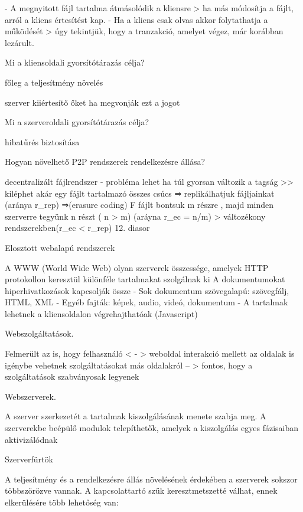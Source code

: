 \documentclass[12pt]{article}
\begin{document}
\begin{description}
        - A megnyitott fájl tartalma átmásolódik a kliensre
        > ha más módosítja a fájlt, arról a kliens értesítést kap.
        - Ha a kliens csak olvas akkor folytathatja a működését 
        > úgy tekintjük, hogy a tranzakció, amelyet végez, már korábban lezárult.	
    \item  Mi a kliensoldali gyorsítótárazás célja?
    \item főleg a teljesítmény növelés
    \item szerver kiiértesítő őket ha megvonják ezt a jogot
    \item  Mi a szerveroldali gyorsítótárazás célja?
    \item hibatűrés biztosítása
    \item  Hogyan növelhető P2P rendszerek rendelkezésre állása?
    \item decentralizált fájlrendszer
        - probléma lehet ha túl gyorsan változik a tagság >> kiléphet akár egy fájlt tartalmazó összes csúcs
        ⇒ replikálhatjuk fájljainkat (aránya r\_rep)
        ⇒(erasure coding) F fájlt bontsuk m részre , majd minden szerverre
        tegyünk n részt ( n > m) (aráyna r\_ec = n/m) 
        > változékony rendszerekben(r\_ec < r\_rep)
        12. diasor
    \item  Elosztott webalapú rendszerek
    \item A WWW (World Wide Web) olyan szerverek összessége, amelyek HTTP protokollon keresztül különféle tartalmakat szolgálnak ki
        A dokumentumokat hiperhivatkozások kapcsolják össze
        - Sok dokumentum szövegalapú: szövegfálj, HTML, XML
        - Egyéb fajták: képek, audio, videó, dokumentum
        - A tartalmak lehetnek a kliensoldalon végrehajthatóak (Javascript)
    \item  Webszolgáltatások.
    \item Felmerült az is, hogy felhasználó < - > weboldal interakció mellett az oldalak is igénybe vehetnek szolgáltatásokat más
        oldalakról -- > fontos, hogy a szolgáltatások szabványosak legyenek
    \item  Webszerverek.
    \item A szerver szerkezetét a tartalmak kiszolgálásának menete szabja meg. A szerverekbe beépülő modulok telepíthetők,
        amelyek a kiszolgálás egyes fázisaiban aktivizálódnak
    \item  Szerverfürtök    
    \item A teljesítmény és a rendelkezésre állás növelésének érdekében a szerverek sokszor többszörözve vannak.
        A kapcsolattartó szűk keresztmetszetté válhat, ennek elkerülésére több lehetőség van:

\end{description}
\end{document}
